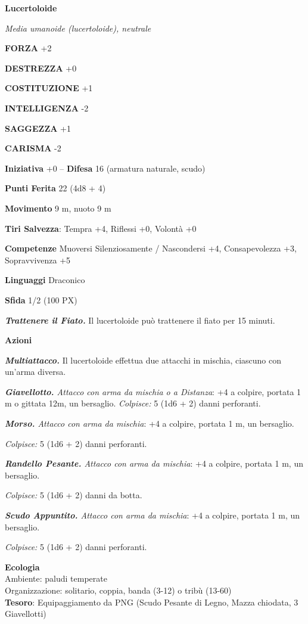 \begin{multicols}{2}
	\medskip{}\textbf{Lucertoloide}

	\textit{Media umanoide (lucertoloide), neutrale}

	\textbf{FORZA} +2

	\textbf{DESTREZZA} +0

	\textbf{COSTITUZIONE} +1

	\textbf{INTELLIGENZA} -2

	\textbf{SAGGEZZA} +1

	\textbf{CARISMA} -2

	\textbf{Iniziativa} +0 -- \textbf{Difesa} 16 (armatura naturale, scudo)

	\textbf{Punti Ferita} 22 (4d8 + 4)

	\textbf{Movimento} 9 m, nuoto 9 m

	\textbf{Tiri Salvezza}: Tempra +4, Riflessi +0, Volontà +0

	\textbf{Competenze} Muoversi Silenziosamente / Nascondersi +4, Consapevolezza +3, Sopravvivenza +5

	\textbf{Linguaggi} Draconico

	\textbf{Sfida} 1/2 (100 PX)

	\textit{\textbf{Trattenere il Fiato.}} Il lucertoloide può trattenere il fiato per 15 minuti.

	\textbf{Azioni}

	\textit{\textbf{Multiattacco.}} Il lucertoloide effettua due attacchi in mischia, ciascuno con un'arma diversa.

	\textit{\textbf{Giavellotto.} Attacco con arma da mischia o a Distanza}: +4 a colpire, portata 1 m o gittata 12m, un bersaglio. \textit{Colpisce:} 5 (1d6 + 2) danni perforanti.

	\textit{\textbf{Morso.} Attacco con arma da mischia}: +4 a colpire, portata 1 m, un bersaglio.

	\textit{Colpisce:} 5 (1d6 + 2) danni perforanti.

	\textit{\textbf{Randello Pesante.} Attacco con arma da mischia}: +4 a colpire, portata 1 m, un bersaglio.

	\textit{Colpisce:} 5 (1d6 + 2) danni da botta.

	\textit{\textbf{Scudo Appuntito.} Attacco con arma da mischia}: +4 a colpire, portata 1 m, un bersaglio.

	\textit{Colpisce:} 5 (1d6 + 2) danni perforanti.

	\textbf{Ecologia}\\
	Ambiente: paludi temperate\\
	Organizzazione: solitario, coppia, banda (3-12) o tribù (13-60)\\
	\textbf{Tesoro}: Equipaggiamento da PNG (Scudo Pesante di Legno, Mazza chiodata, 3 Giavellotti)\\


\end{multicols}
